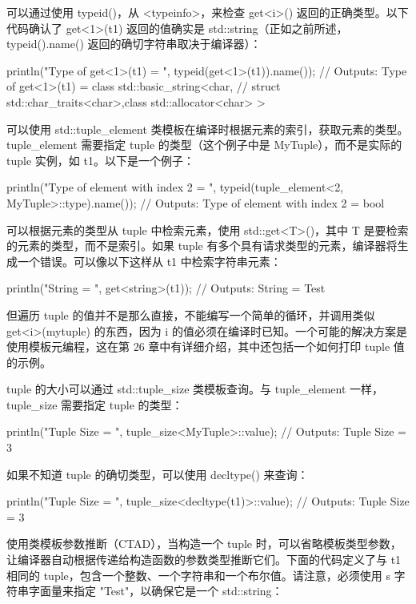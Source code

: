 可以通过使用 typeid()，从 <typeinfo>，来检查 get<i>() 返回的正确类型。以下代码确认了 get<1>(t1) 返回的值确实是 std::string（正如之前所述，typeid().name() 返回的确切字符串取决于编译器）：

\begin{cpp}
println("Type of get<1>(t1) = {}", typeid(get<1>(t1)).name());
// Outputs: Type of get<1>(t1) = class std::basic_string<char,
// struct std::char_traits<char>,class std::allocator<char> >
\end{cpp}

可以使用 std::tuple\_element 类模板在编译时根据元素的索引，获取元素的类型。tuple\_element 需要指定 tuple 的类型（这个例子中是 MyTuple），而不是实际的 tuple 实例，如 t1。以下是一个例子：

\begin{cpp}
println("Type of element with index 2 = {}",
    typeid(tuple_element<2, MyTuple>::type).name());
// Outputs: Type of element with index 2 = bool
\end{cpp}

可以根据元素的类型从 tuple 中检索元素，使用 std::get<T>()，其中 T 是要检索的元素的类型，而不是索引。如果 tuple 有多个具有请求类型的元素，编译器将生成一个错误。可以像以下这样从 t1 中检索字符串元素：

\begin{cpp}
println("String = {}", get<string>(t1));
// Outputs: String = Test
\end{cpp}

但遍历 tuple 的值并不是那么直接，不能编写一个简单的循环，并调用类似 get<i>(mytuple) 的东西，因为 i 的值必须在编译时已知。一个可能的解决方案是使用模板元编程，这在第 26 章中有详细介绍，其中还包括一个如何打印 tuple 值的示例。

tuple 的大小可以通过 std::tuple\_size 类模板查询。与 tuple\_element 一样，tuple\_size 需要指定 tuple 的类型：

\begin{cpp}
println("Tuple Size = {}", tuple_size<MyTuple>::value);
// Outputs: Tuple Size = 3
\end{cpp}

如果不知道 tuple 的确切类型，可以使用 decltype() 来查询：

\begin{cpp}
println("Tuple Size = {}", tuple_size<decltype(t1)>::value);
// Outputs: Tuple Size = 3
\end{cpp}

使用类模板参数推断（CTAD），当构造一个 tuple 时，可以省略模板类型参数，让编译器自动根据传递给构造函数的参数类型推断它们。下面的代码定义了与 t1 相同的 tuple，包含一个整数、一个字符串和一个布尔值。请注意，必须使用 s 字符串字面量来指定 "Test"，以确保它是一个 std::string：

